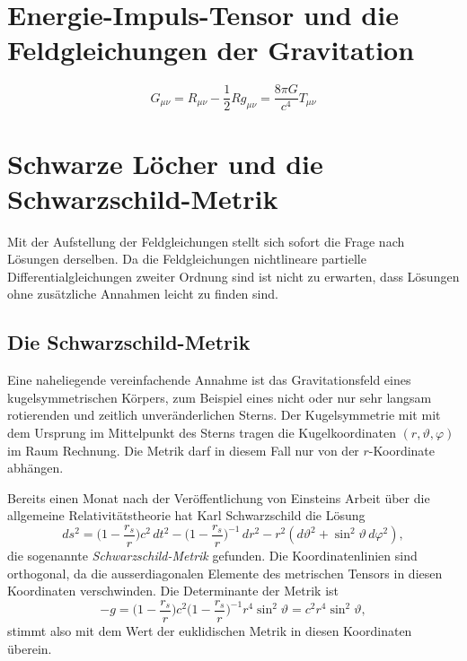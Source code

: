 %
%
\section{Energie-Impuls-Tensor und die Feldgleichungen der Gravitation
\label{buch:kruemmung:section:gravitation}}

\begin{equation}
G_{\mu\nu}
=
R_{\mu\nu}
-
\frac12 Rg_{\mu\nu}
=
\frac{8\pi G}{c^4}T_{\mu\nu}
\label{buch:kruemmung:feldgleichung:eqn:feldgleichung}
\end{equation}

%
%
\section{Schwarze Löcher und die Schwarzschild-Metrik
\label{buch:kruemmung:section:schwarzesloch}}
Mit der Aufstellung der Feldgleichungen stellt sich sofort die Frage
nach Lösungen derselben.
Da die Feldgleichungen nichtlineare partielle Differentialgleichungen
zweiter Ordnung sind ist nicht zu erwarten, dass Lösungen ohne
zusätzliche Annahmen leicht zu finden sind.

\subsection{Die Schwarzschild-Metrik}
Eine naheliegende vereinfachende Annahme ist das Gravitationsfeld
eines kugelsymmetrischen Körpers, zum Beispiel eines nicht oder nur
sehr langsam rotierenden und zeitlich unveränderlichen Sterns.
Der Kugelsymmetrie mit mit dem Ursprung im Mittelpunkt des Sterns
tragen die Kugelkoordinaten $(r,\vartheta,\varphi)$ im Raum Rechnung.
Die Metrik darf in diesem Fall nur von der $r$-Koordinate abhängen.

Bereits einen Monat nach der Veröffentlichung von Einsteins Arbeit
über die allgemeine Relativitätstheorie hat Karl Schwarzschild
%
die Lösung
\begin{equation}
ds^2
=
\biggl( 1-\frac{r_s}{r} \biggr)
c^2\,dt^2
-
\biggl(1-\frac{r_s}{r}\biggr)^{-1}
\,dr^2
-r^2 (d\vartheta^2 + \sin^2\vartheta\,d\varphi^2),
\label{buch:kruemmung:blackhole:eqn:schwarzschild}
\end{equation}
die sogenannte \emph{Schwarzschild-Metrik}
%
gefunden.
Die Koordinatenlinien sind orthogonal, da die ausserdiagonalen Elemente
des metrischen Tensors in diesen Koordinaten verschwinden.
Die Determinante der Metrik ist
\begin{equation}
-g
=
\biggl( 1-\frac{r_s}{r} \biggr)
c^2
\biggl(1-\frac{r_s}{r}\biggr)^{-1}
r^4 \sin^2\vartheta
=
c^2r^4\sin^2\vartheta,
\label{buch:kruemmung:schwarzesloch:eqn:g}
\end{equation}
stimmt also mit dem Wert der euklidischen Metrik in diesen Koordinaten
überein.

